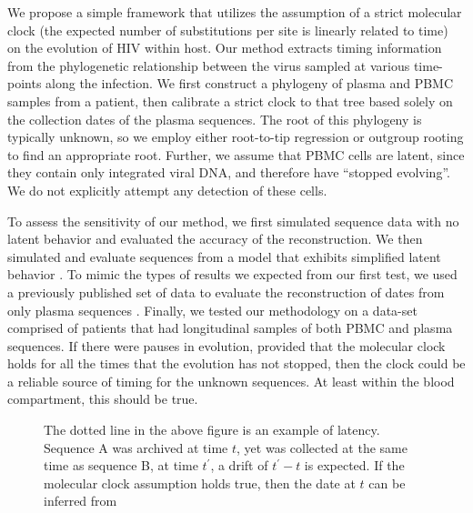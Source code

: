 We propose a simple framework that utilizes the assumption of a strict molecular clock (the expected number of substitutions per site is linearly related to time) on the evolution of HIV within host. Our method extracts timing information from the phylogenetic relationship between the virus sampled at various time-points along the infection. We first construct a phylogeny of plasma and PBMC samples from a patient, then calibrate a strict clock to that tree based solely on the collection dates of the plasma sequences. The root of this phylogeny is typically unknown, so we employ either root-to-tip regression or outgroup rooting to find an appropriate root. Further, we assume that PBMC cells are latent, since they contain only integrated viral DNA, and therefore have ``stopped evolving''. We do not explicitly attempt any detection of these cells. 

To assess the sensitivity of our method, we first simulated sequence data with no latent behavior and evaluated the accuracy of the reconstruction. We then simulated and evaluate sequences from a model that exhibits simplified latent behavior  \citep{Immonen14}. To mimic the types of results we expected from our first test, we used a previously published set of data to evaluate the reconstruction of dates from only plasma sequences \citep{McCloskey14}. Finally, we tested our methodology on a data-set comprised of patients that had longitudinal samples of both PBMC and plasma sequences.  If there were pauses in evolution, provided that the molecular clock holds for all the times that the evolution has not stopped, then the clock could be a reliable source of timing for the unknown sequences. At least within the blood compartment, this should be true. 

\begin{figure} \label{fig:latenttree}
	\centering
	\scalebox{5}{}
	\caption[Example of latent behavior]{The dotted line in the above figure is an example of latency. Sequence A was archived at time $t$, yet was collected at the same time as sequence B, at time $t^\prime$, a drift of $t^\prime - t$ is expected. If the molecular clock assumption holds true, then the date at $t$ can be inferred from }
\end{figure}
